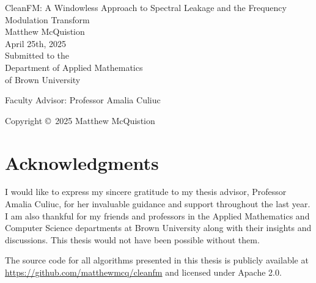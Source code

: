 \documentclass[11pt,twoside]{report}
\numberwithin{thm}{section}
\numberwithin{equation}{section}
\begin{document}

\setlength{\baselineskip}{21pt}





\begin{titlepage}
\mbox{}
\vspace{1in}
\begin{center}
\LARGE CleanFM: A Windowless Approach to Spectral Leakage and the Frequency Modulation Transform \\
 [2in]
\normalsize  Matthew McQuistion \\[\medskipamount]
April 25th, 2025 \\[1in]
Submitted to the \\
Department of Applied Mathematics \\
of Brown University  \\

\end{center}
\vfill
\begin{center}
Faculty Advisor: Professor Amalia Culiuc
\end{center}
\vfill
\begin{center}
Copyright \copyright\ 2025 Matthew McQuistion
\end{center}
\end{titlepage}






\chapter*{Acknowledgments}

I would like to express my sincere gratitude to my thesis advisor, Professor Amalia Culiuc, for her invaluable guidance and support throughout the last year. I am also thankful for my friends and professors in the Applied Mathematics and Computer Science departments at Brown University along with their insights and discussions. This thesis would not have been possible without them.

The source code for all algorithms presented in this thesis is publicly available at \\\url{https://github.com/matthewmcq/cleanfm} and licensed under Apache 2.0.
\end{document}
